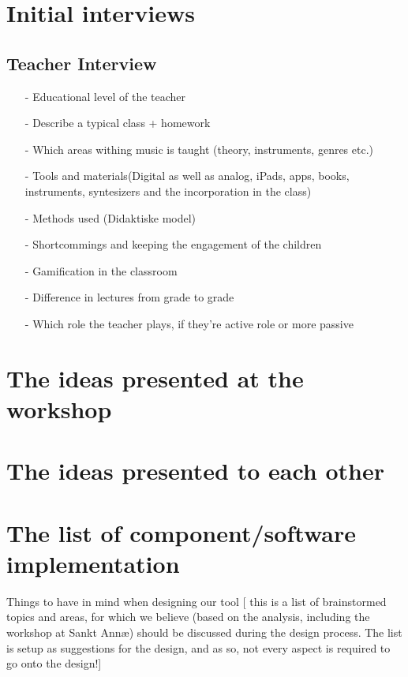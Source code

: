 \section{Initial interviews}\label{sec:initialInterviews}
	\subsection{Teacher Interview}
		\begin{itemize}
		\item[-] Educational level of the teacher 
		\item[-] Describe a typical class + homework
		\item[-] Which areas withing music is taught (theory, instruments, genres etc.)
		\item[-] Tools and materials(Digital as well as analog, iPads, apps, books, instruments, syntesizers and the incorporation in the class)
		\item[-] Methods used (Didaktiske model)
		\item[-] Shortcommings and keeping the engagement of the children
		\item[-] Gamification in the classroom
		\item[-] Difference in lectures from grade to grade
		\item[-] Which role the teacher plays, if they're active role or more passive
		\end{itemize}
	
	
\section{The ideas presented at the workshop}
\section{The ideas presented to each other}
\section{The list of component/software implementation}
Things to have in mind when designing our tool
[ this is a list of brainstormed topics and areas, for which we believe (based on the analysis, including the workshop at Sankt Annæ) should be discussed during the design process. The list is setup as suggestions for the design, and as so, not every aspect is required to go onto the design!]


